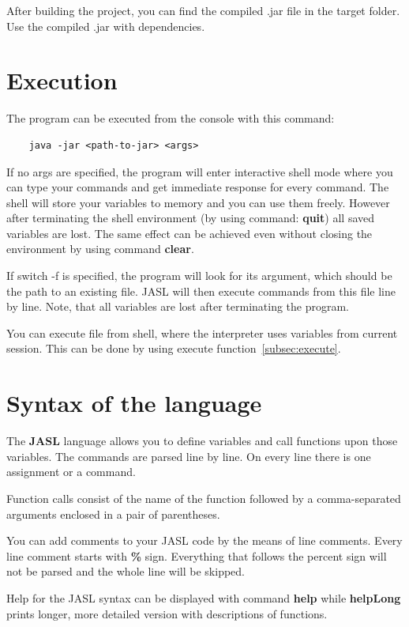 \documentclass{ctuthesis}
\begin{document}
After building the project, you can find the compiled .jar file in the target folder. Use the compiled .jar with dependencies.

\section{Execution}
\label{sec:execution}
The program can be executed from the console with this command:

\begin{verbatim}
	java -jar <path-to-jar> <args>
\end{verbatim}

If no args are specified, the program will enter interactive shell mode where you can type your commands and get immediate response for every command. The shell will store your variables to memory and you can use them freely. However after terminating the shell environment (by using command: \textbf{quit}) all saved variables are lost. The same effect can be achieved even without closing the environment by using command \textbf{clear}. 

If switch -f is specified, the program will look for its argument, which should be the path to an existing file. JASL will then execute commands from this file line by line. Note, that all variables are lost after terminating the program. 

You can execute file from shell, where the interpreter uses variables from current session. This can be done by using execute function~\ref{subsec:execute}. 

\section{Syntax of the language}
The \textbf{JASL} language allows you to define variables and call functions upon those variables. The commands are parsed line by line. On every line there is one assignment or a command. 

Function calls consist of the name of the function followed by a comma-separated arguments enclosed in a pair of parentheses.

You can add comments to your JASL code by the means of line comments. Every line comment starts with \textbf{\%} sign. Everything that follows the percent sign will not be parsed and the whole line will be skipped. 

Help for the JASL syntax can be displayed with command \textbf{help} while \textbf{helpLong} prints longer, more detailed version with descriptions of functions. 
\end{document}
